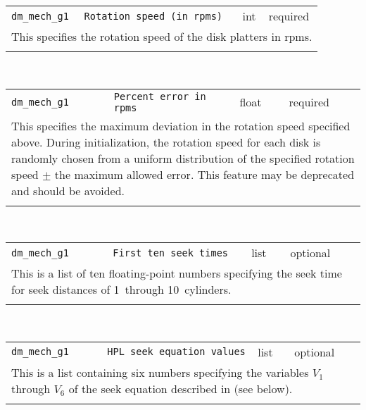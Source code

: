 \noindent 
\begin{tabular}{|p{\lpmodwidth}|p{\lpnamewidth}|p{0.5in}|p{0.5in}|}
\cline{1-4}
\texttt{dm\_mech\_g1} & \texttt{Rotation speed (in rpms)} & int & required \\ 
\cline{1-4}
\multicolumn{4}{|p{6in}|}{
This specifies the rotation speed of the disk platters in rpms.
}\\ 
\cline{1-4}
\multicolumn{4}{p{5in}}{}\\
\end{tabular}\\ 
\noindent 
\begin{tabular}{|p{\lpmodwidth}|p{\lpnamewidth}|p{0.5in}|p{0.5in}|}
\cline{1-4}
\texttt{dm\_mech\_g1} & \texttt{Percent error in rpms} & float & required \\ 
\cline{1-4}
\multicolumn{4}{|p{6in}|}{
This specifies the maximum deviation in the rotation speed specified
above. During initialization, the rotation speed for each
disk is randomly chosen from a uniform distribution of the specified
rotation speed $\pm$ the maximum allowed error.
This feature may be deprecated and should be avoided.
}\\ 
\cline{1-4}
\multicolumn{4}{p{5in}}{}\\
\end{tabular}\\ 
\noindent 
\begin{tabular}{|p{\lpmodwidth}|p{\lpnamewidth}|p{0.5in}|p{0.5in}|}
\cline{1-4}
\texttt{dm\_mech\_g1} & \texttt{First ten seek times} & list & optional \\ 
\cline{1-4}
\multicolumn{4}{|p{6in}|}{
This is a list of ten floating-point numbers specifying the seek time for seek
distances of 1~through 10~cylinders.
}\\ 
\cline{1-4}
\multicolumn{4}{p{5in}}{}\\
\end{tabular}\\ 
\noindent 
\begin{tabular}{|p{\lpmodwidth}|p{\lpnamewidth}|p{0.5in}|p{0.5in}|}
\cline{1-4}
\texttt{dm\_mech\_g1} & \texttt{HPL seek equation values} & list & optional \\ 
\cline{1-4}
\multicolumn{4}{|p{6in}|}{
This is a list containing six numbers specifying the variables
$V_1$ through $V_6$ of the seek equation described in \cite{Ruemmler94}
(see below).
}\\ 
\cline{1-4}
\multicolumn{4}{p{5in}}{}\\
\end{tabular}\\ 
